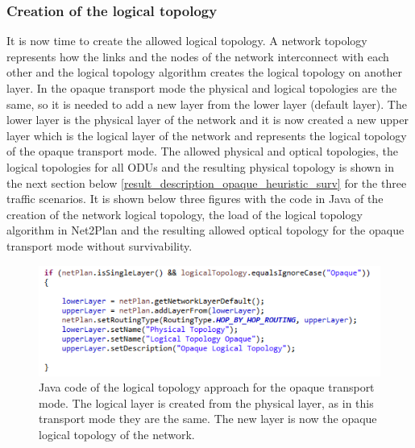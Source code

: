 \subsubsection{Creation of the logical topology}

\vspace{11pt}
It is now time to create the allowed logical topology. A network topology represents how the links and the nodes of the network interconnect with each other and the logical topology algorithm creates the logical topology on another layer. In the opaque transport mode the physical and logical topologies are the same, so it is needed to add a new layer from the lower layer (default layer). The lower layer is the physical layer of the network and it is now created a new upper layer which is the logical layer of the network and represents the logical topology of the opaque transport mode. The allowed physical and optical topologies, the logical topologies for all ODUs and the resulting physical topology is shown in the next section below \ref{result_description_opaque_heuristic_surv} for the three traffic scenarios. It is shown below three figures with the code in Java of the creation of the network logical topology, the load of the logical topology algorithm in Net2Plan and the resulting allowed optical topology for the opaque transport mode without survivability.

\begin{figure}[H]
\centering
\includegraphics[width=15cm]{sdf/heuristic/opaque_survivability/figures/logical_topology_creation_opaque}
\caption{Java code of the logical topology approach for the opaque transport mode. The logical layer is created from the physical layer, as in this transport mode they are the same. The new layer is now the opaque logical topology of the network.}
\label{logical_topology_creation_opaque_surv}
\end{figure}


